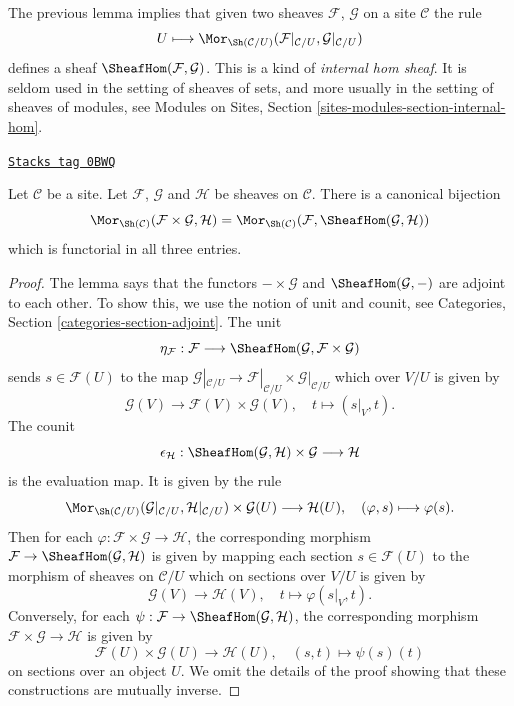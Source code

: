 The previous lemma implies that given two sheaves $\mathcal{F}$,
$\mathcal{G}$ on a site $\mathcal{C}$ the rule
$$
U \longmapsto
\Mor_{\Sh(\mathcal{C}/U)}(
\mathcal{F}|_{\mathcal{C}/U}, \mathcal{G}|_{\mathcal{C}/U})
$$
defines a sheaf $\SheafHom(\mathcal{F},\mathcal{G})$.
This is a kind of {\it internal hom sheaf}. It is
seldom used in the setting of sheaves of sets, and more usually
in the setting of sheaves of modules, see
Modules on Sites, Section \ref{sites-modules-section-internal-hom}.

\begin{lemma}
\label{sites-lemma-internal-hom-sheaf}
\href{https://stacks.math.columbia.edu/tag/0BWQ}{\texttt{Stacks tag 0BWQ}}


Let $\mathcal{C}$ be a site. Let $\mathcal{F}$, $\mathcal{G}$ and
$\mathcal{H}$ be sheaves on $\mathcal{C}$. There is a canonical bijection
$$
\Mor_{\Sh(\mathcal{C})}(\mathcal{F}\times\mathcal{G},\mathcal{H}) =
\Mor_{\Sh(\mathcal{C})}(\mathcal{F},\SheafHom(\mathcal{G},\mathcal{H}))
$$
which is functorial in all three entries.
\end{lemma}

\begin{proof}
The lemma says that the functors $-\times\mathcal{G}$ and
$\SheafHom(\mathcal{G},-)$ are adjoint to each other.
To show this, we use the notion of unit and counit, see
Categories, Section \ref{categories-section-adjoint}.
The unit
$$
\eta_\mathcal{F} :
\mathcal{F}
\longrightarrow
\SheafHom(\mathcal{G},\mathcal{F}\times\mathcal{G})
$$
sends $s \in \mathcal{F}(U)$ to the map
$\mathcal{G}|_{\mathcal{C}/U} \to
\mathcal{F}|_{\mathcal{C}/U}\times\mathcal{G}|_{\mathcal{C}/U}$
which over $V/U$ is given by
$$
\mathcal{G}(V) \longrightarrow \mathcal{F}(V)\times \mathcal{G}(V), \quad
t \longmapsto (s|_{V},t).
$$
The counit
$$
\epsilon_{\mathcal{H}} :
\SheafHom(\mathcal{G}, \mathcal{H}) \times \mathcal{G}
\longrightarrow
\mathcal{H}
$$
is the evaluation map. It is given by the rule
$$
\Mor_{\Sh(\mathcal{C}/U)}(
\mathcal{G}|_{\mathcal{C}/U}, \mathcal{H}|_{\mathcal{C}/U})
\times \mathcal{G}(U)
\longrightarrow
\mathcal{H}(U),\quad
(\varphi, s) \longmapsto \varphi(s).
$$
Then for each $\varphi : \mathcal{F} \times \mathcal{G} \to \mathcal{H}$,
the corresponding morphism
$\mathcal{F} \to \SheafHom(\mathcal{G},\mathcal{H})$
is given by mapping each section $s \in \mathcal{F}(U)$
to the morphism of sheaves on $\mathcal{C}/U$ which on
sections over $V/U$ is given by
$$
\mathcal{G}(V) \longrightarrow \mathcal{H}(V),\quad
t \longmapsto \varphi(s|_V, t).
$$
Conversely, for each
$\psi : \mathcal{F} \to \SheafHom(\mathcal{G}, \mathcal{H})$,
the corresponding morphism
$\mathcal{F} \times \mathcal{G} \to \mathcal{H}$ is given by
$$
\mathcal{F}(U) \times \mathcal{G}(U) \longrightarrow \mathcal{H}(U),\quad
(s, t) \longmapsto \psi(s)(t)
$$
on sections over an object $U$. We omit the details of the proof showing
that these constructions are mutually inverse.
\end{proof}

